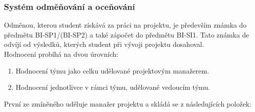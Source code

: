 \subsubsection{Systém odměňování a oceňování} \label{ppl:ranking}
Odměnou, kterou student získává za práci na projektu, je především známka do předmětu BI-SP1/(BI-SP2) a také zápočet do předmětu BI-SI1. Tato známka de odvíjí od výsledků, kterých student při vývoji projektu dosahoval.\\
Hodnocení probíhá na dvou úrovních:
\begin{enumerate}
	\item Hodnocení týmu jako celku udělované projektovým manažerem.
	\item Hodnocení jednotlivce v rámci týmu, udělované vedoucím týmu.
\end{enumerate}
První ze zmíněného uděluje manažer projektu a skládá se z následujících položek:
